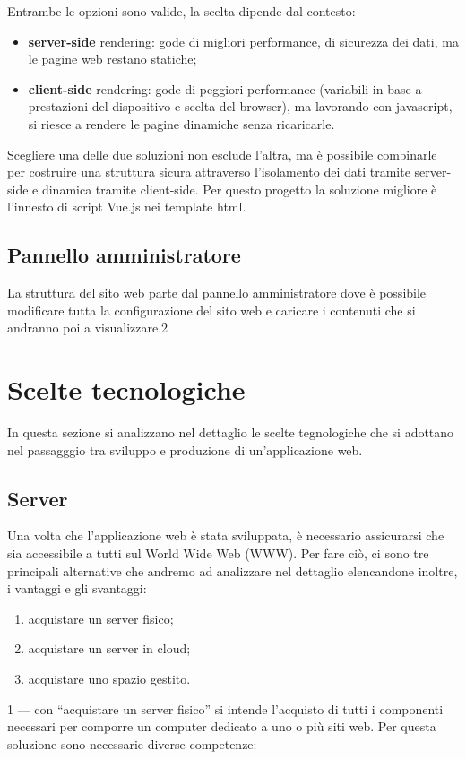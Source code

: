 \documentclass[12pt,a4paper]{article}
\begin{document}
Entrambe le opzioni sono valide, la scelta dipende dal contesto:
\begin{itemize}
    \item \textbf{server-side} rendering: gode di migliori performance, di sicurezza dei dati, ma le pagine web restano statiche;
    \item \textbf{client-side} rendering: gode di peggiori performance (variabili in base a prestazioni del dispositivo e scelta del browser), ma lavorando con javascript, si riesce a rendere le pagine dinamiche senza ricaricarle.
\end{itemize}
Scegliere una delle due soluzioni non esclude l’altra, ma è possibile combinarle per costruire una struttura sicura attraverso l’isolamento dei dati tramite server-side e dinamica tramite client-side. Per questo progetto la soluzione migliore è l’innesto di script Vue.js nei template html.

\subsection{Pannello amministratore}
La struttura del sito web parte dal pannello amministratore dove è possibile modificare tutta la configurazione del sito web e caricare i contenuti che si andranno poi a visualizzare.2



\clearpage
\section{Scelte tecnologiche}
In questa sezione si analizzano nel dettaglio le scelte tegnologiche che si adottano nel passagggio tra sviluppo e produzione di un'applicazione web.

\subsection{Server}

Una volta che l’applicazione web è stata sviluppata, è necessario assicurarsi che sia accessibile a tutti sul World Wide Web (WWW). Per fare ciò, ci sono tre principali alternative che andremo ad analizzare nel dettaglio elencandone inoltre, i vantaggi e gli svantaggi:
\begin{enumerate}
    \item acquistare un server fisico;
    \item acquistare un server in cloud;
    \item acquistare uno spazio gestito.
\end{enumerate}
1 --- con “acquistare un server fisico” si intende l’acquisto di tutti i componenti necessari per comporre un computer dedicato a uno o più siti web. Per questa soluzione sono necessarie diverse competenze:
\end{document}
